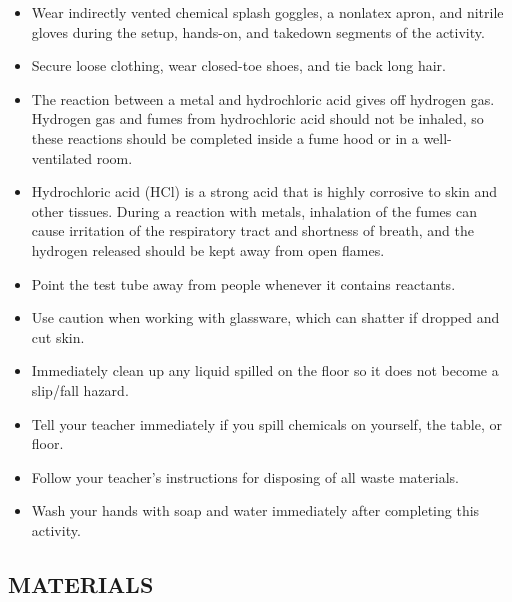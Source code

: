 \documentclass[a4paper,12pt]{exam}
\begin{document}
\begin{itemize}



    \item Wear indirectly vented chemical splash goggles, a nonlatex apron, and nitrile gloves during
the setup, hands-on, and takedown segments of the activity.

\item Secure loose clothing, wear closed-toe shoes, and tie back long hair.

\item The reaction between a metal and hydrochloric acid gives off hydrogen gas. Hydrogen gas
and fumes from hydrochloric acid should not be inhaled, so these reactions should be
completed inside a fume hood or in a well-ventilated room.

\item Hydrochloric acid (HCl) is a strong acid that is highly corrosive to skin and other tissues.
During a reaction with metals, inhalation of the fumes can cause irritation of the respiratory
tract and shortness of breath, and the hydrogen released should be kept away from open
flames.

\item  Point the test tube away from people whenever it contains reactants.

\item Use caution when working with glassware, which can shatter if dropped and cut skin.

\item Immediately clean up any liquid spilled on the floor so it does not become a slip/fall hazard.

\item Tell your teacher immediately if you spill chemicals on yourself, the table, or floor.

\item Follow your teacher’s instructions for disposing of all waste materials.

\item Wash your hands with soap and water immediately after completing this activity.

\end{itemize}

 \subsection*{MATERIALS}
\end{document}
